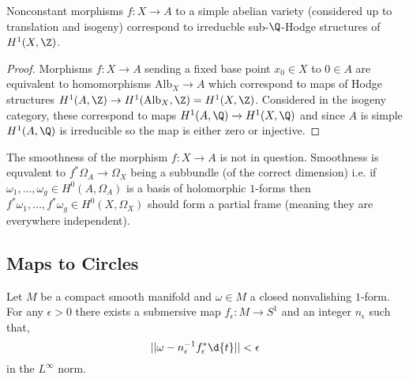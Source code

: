 \documentclass[12pt]{article}
\begin{document}
\begin{cor}
Nonconstant morphisms $f : X \to A$ to a simple abelian variety (considered up to translation and isogeny) correspond to irreducble sub-$\Q$-Hodge structures of $H^1(X, \Z)$.
\end{cor}

\newcommand{\Alb}{\mathrm{Alb}}

\begin{proof}
Morphisms $f : X \to A$ sending a fixed base point $x_0 \in X$ to $0 \in A$ are equivalent to homomorphisms $\mathrm{Alb}_X \to A$ which correspond to maps of Hodge structures $H^1(A, \Z) \to H^1(\Alb_X, \Z) = H^1(X, \Z)$. Considered in the isogeny category, these correspond to maps $H^1(A, \Q) \to H^1(X, \Q)$ and since $A$ is simple $H^1(A, \Q)$ is irreducible so the map is either zero or injective.
\end{proof}

The smoothness of the morphism $f : X \to A$ is not in question. Smoothness is equvalent to $f^* \Omega_A \to \Omega_X$ being a subbundle (of the correct dimension) i.e. if $\omega_1, \dots, \omega_g \in H^0(A, \Omega_A)$ is a basis of holomorphic $1$-forms then $f^* \omega_1, \dots, f^* \omega_g \in H^0(X, \Omega_X)$ should form a partial frame (meaning they are everywhere independent). 


\subsection{Maps to Circles}

\begin{prop}
Let $M$ be a compact smooth manifold and $\omega \in M$ a closed nonvalishing $1$-form. For any $\epsilon > 0$ there exists a submersive map $f_\epsilon : M \to S^1$ and an integer $n_\epsilon$ such that,
\[ || \omega - n_\epsilon^{-1} f_\epsilon^* \d{t} || < \epsilon \]
in the $L^\infty$ norm.
\end{prop}
\end{document}
